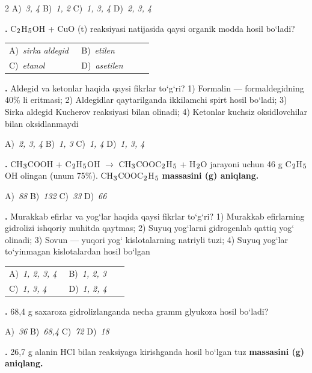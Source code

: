 \documentclass[11pt,a4paper]{article}
\renewcommand{\textsubscript}[1]{\ensuremath{_{\text{\fontsize{8}{8}\selectfont #1}}}}
\newcommand{\qn}[1]{\textbf{\fontsize{11.5}{13}\selectfont #1}}
\newcommand{\qsep}{\par\vspace{1pt}\noindent\rule{0pt}{0.4pt}\par\vspace{5pt}}
\begin{document}
\begin{multicols}{2}
\noindent A)~\textsl{3, 4} \hfill B)~\textsl{1, 2} \hfill C)~\textsl{1, 3, 4} \hfill D)~\textsl{2, 3, 4}\par
\qsep
\noindent\qn{23.} C\textsubscript{2}H\textsubscript{5}OH + CuO (t) reaksiyasi natijasida qaysi organik modda hosil bo`ladi?

\noindent\begin{tabular}{@{}p{0.47\linewidth}@{}p{0.47\linewidth}@{}}
A)~\textsl{sirka aldegid} & B)~\textsl{etilen} \\
C)~\textsl{etanol} & D)~\textsl{asetilen} \\
\end{tabular}\par
\qsep
\noindent\qn{24.} Aldegid va ketonlar haqida qaysi fikrlar to`g`ri? 1) Formalin --- formaldegidning 40\% li eritmasi; 2) Aldegidlar qaytarilganda ikkilamchi spirt hosil bo`ladi; 3) Sirka aldegid Kucherov reaksiyasi bilan olinadi; 4) Ketonlar kuchsiz oksidlovchilar bilan oksidlanmaydi

\noindent A)~\textsl{2, 3, 4} \hfill B)~\textsl{1, 3} \hfill C)~\textsl{1, 4} \hfill D)~\textsl{1, 3, 4}\par
\qsep
\noindent\qn{25.} CH\textsubscript{3}COOH + C\textsubscript{2}H\textsubscript{5}OH $\to$ CH\textsubscript{3}COOC\textsubscript{2}H\textsubscript{5} + H\textsubscript{2}O jarayoni uchun 46 g C\textsubscript{2}H\textsubscript{5}OH olingan (unum 75\%). CH\textsubscript{3}COOC\textsubscript{2}H\textsubscript{5} \textbf{massasini (g) aniqlang.}

\noindent A)~\textsl{88} \hfill B)~\textsl{132} \hfill C)~\textsl{33} \hfill D)~\textsl{66}\par
\qsep
\noindent\qn{26.} Murakkab efirlar va yog`lar haqida qaysi fikrlar to`g`ri? 1) Murakkab efirlarning gidrolizi ishqoriy muhitda qaytmas; 2) Suyuq yog`larni gidrogenlab qattiq yog` olinadi; 3) Sovun --- yuqori yog` kislotalarning natriyli tuzi; 4) Suyuq yog`lar to`yinmagan kislotalardan hosil bo`lgan

\noindent\begin{tabular}{@{}p{0.47\linewidth}@{}p{0.47\linewidth}@{}}
A)~\textsl{1, 2, 3, 4} & B)~\textsl{1, 2, 3} \\
C)~\textsl{1, 3, 4} & D)~\textsl{1, 2, 4} \\
\end{tabular}\par
\qsep
\noindent\qn{27.} 68,4 g saxaroza gidrolizlanganda necha gramm glyukoza hosil bo`ladi?

\noindent A)~\textsl{36} \hfill B)~\textsl{68,4} \hfill C)~\textsl{72} \hfill D)~\textsl{18}\par
\qsep
\noindent\qn{28.} 26,7 g alanin HCl bilan reaksiyaga kirishganda hosil bo`lgan tuz \textbf{massasini (g) aniqlang.}


\end{multicols}
\end{document}
